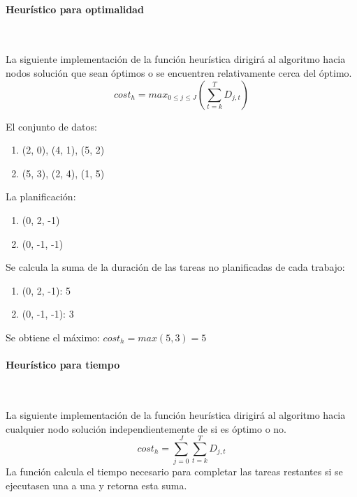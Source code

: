 \paragraph{Heurístico para optimalidad}~

La siguiente implementación de la función heurística
dirigirá al algoritmo hacia nodos solución que sean óptimos
o se encuentren relativamente cerca del óptimo.
$$
    cost_h = max_{0 \leq j \le J}\left(
        \sum_{t=k}^{T}{D_{j,t}}
    \right)
$$
\begin{examplebox}
    El conjunto de datos:
    \begin{enumerate}[itemsep=0.25px]
        \item (2, 0), (4, 1), (5, 2)
        \item (5, 3), (2, 4), (1, 5)
    \end{enumerate}
    La planificación:
    \begin{enumerate}[itemsep=0.25px]
        \item (0, 2, -1)
        \item (0, -1, -1)
    \end{enumerate}
    Se calcula la suma de la duración de las tareas no planificadas de cada trabajo:
    \begin{enumerate}[itemsep=0.25px]
        \item (0, 2, -1): 5
        \item (0, -1, -1): 3
    \end{enumerate}
    Se obtiene el máximo: $cost_h = max(5, 3) = 5$
\end{examplebox}

\pagebreak

\paragraph{Heurístico para tiempo}~

La siguiente implementación de la función heurística
dirigirá al algoritmo hacia cualquier nodo solución
independientemente de si es óptimo o no.
$$
    cost_h = \sum_{j=0}^{J}{\sum_{t=k}^{T}{D_{j,t}}}
$$
La función calcula el tiempo necesario para completar
las tareas restantes si se ejecutasen una a una
y retorna esta suma.

